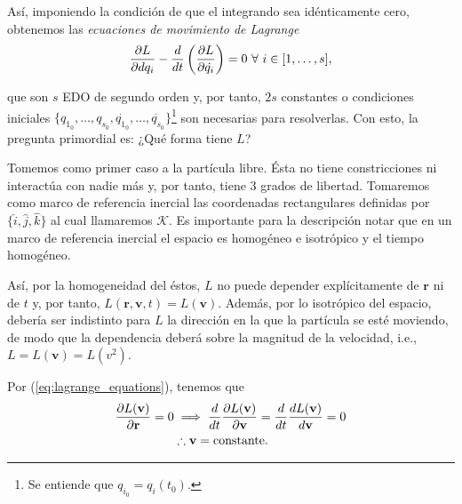 Así, imponiendo la condición de que el integrando sea idénticamente cero, obtenemos las \textit{ecuaciones de movimiento de Lagrange}
\begin{equation}
 \frac{\partial L}{\partial d q_i} - \frac{d}{dt} \left( \frac{\partial L}{\partial  \dot{q_i} } \right) = 0 \ \forall \ i \in [1, \ldots, s],
 \label{eq:lagrange_equations}
\end{equation}

que son $s$ EDO de segundo orden y, por tanto, $2s$ constantes o condiciones iniciales $\{ q_{1_0}, \ldots, q_{s_0}, \dot{q_{1_0}}, \ldots, \dot{q_{s_0}} \}$\footnote{Se entiende que $q_{i_0} = q_i(t_0)$.} son necesarias para resolverlas. Con esto, la pregunta primordial es: ¿Qué forma tiene $L$?

Tomemos como primer caso a la partícula libre. Ésta no tiene constricciones ni interactúa con nadie más y, por tanto, tiene 3 grados de libertad. Tomaremos como marco de referencia inercial las coordenadas rectangulares definidas por $\{ \hat{i}, \hat{j}, \hat{k} \}$ al cual llamaremos $\mathcal{K}$. Es importante para la descripción notar que en un marco de referencia inercial el espacio es homogéneo e isotrópico y el tiempo homogéneo. 

Así, por la homogeneidad del éstos, $L$ no puede depender explícitamente de $\mathbf{r}$ ni de $t$ y, por tanto, $L(\mathbf{r},\mathbf{v},t) = L(\mathbf{v})$. Además, por lo isotrópico del espacio, debería ser indistinto para $L$ la dirección en la que la partícula se esté moviendo, de modo que la dependencia deberá sobre la magnitud de la velocidad, i.e., $L = L(\mathbf{v}) = L(v^2)$.

Por (\ref{eq:lagrange_equations}), tenemos que 
 \begin{align*}
 \frac{\partial L(\mathbf{v}) }{\partial  \mathbf{r} } = 0 &\implies \frac{d}{dt}\frac{\partial L(\mathbf{v})}{\partial \mathbf{v}} = \frac{d}{dt} \frac{dL(\mathbf{v})}{d\mathbf{v}} = 0 \\ 
 &\therefore \mathbf{v} = \text{constante}.
 \end{align*}


